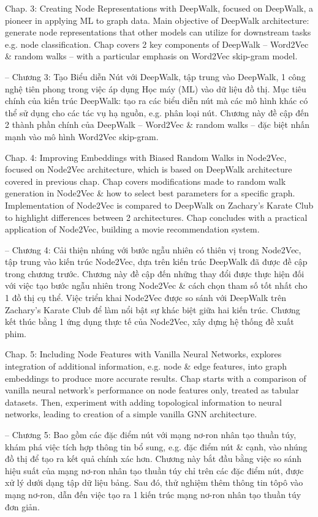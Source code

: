 \documentclass{article}
\begin{document}
\begin{itemize}
\begin{itemize}
        Chap. 3: Creating Node Representations with DeepWalk, focused on DeepWalk, a pioneer in applying ML to graph data. Main objective of DeepWalk architecture: generate node representations that other models can utilize for downstream tasks e.g. node classification. Chap covers 2 key components of DeepWalk -- Word2Vec \& random walks -- with a particular emphasis on Word2Vec skip-gram model.

        -- Chương 3: Tạo Biểu diễn Nút với DeepWalk, tập trung vào DeepWalk, 1 công nghệ tiên phong trong việc áp dụng Học máy (ML) vào dữ liệu đồ thị. Mục tiêu chính của kiến trúc DeepWalk: tạo ra các biểu diễn nút mà các mô hình khác có thể sử dụng cho các tác vụ hạ nguồn, e.g. phân loại nút. Chương này đề cập đến 2 thành phần chính của DeepWalk -- Word2Vec \& random walks -- đặc biệt nhấn mạnh vào mô hình Word2Vec skip-gram.

        Chap. 4: Improving Embeddings with Biased Random Walks in Node2Vec, focused on Node2Vec architecture, which is based on DeepWalk architecture covered in previous chap. Chap covers modifications made to random walk generation in Node2Vec \& how to select best parameters for a specific graph. Implementation of Node2Vec is compared to DeepWalk on Zachary's Karate Club to highlight differences between 2 architectures. Chap concludes with a practical application of Node2Vec, building a movie recommendation system.

        -- Chương 4: Cải thiện nhúng với bước ngẫu nhiên có thiên vị trong Node2Vec, tập trung vào kiến trúc Node2Vec, dựa trên kiến trúc DeepWalk đã được đề cập trong chương trước. Chương này đề cập đến những thay đổi được thực hiện đối với việc tạo bước ngẫu nhiên trong Node2Vec \& cách chọn tham số tốt nhất cho 1 đồ thị cụ thể. Việc triển khai Node2Vec được so sánh với DeepWalk trên Zachary's Karate Club để làm nổi bật sự khác biệt giữa hai kiến trúc. Chương kết thúc bằng 1 ứng dụng thực tế của Node2Vec, xây dựng hệ thống đề xuất phim.

        Chap. 5: Including Node Features with Vanilla Neural Networks, explores integration of additional information, e.g. node \& edge features, into graph embeddings to produce more accurate results. Chap starts with a comparison of vanilla neural network's performance on node features only, treated as tabular datasets. Then, experiment with adding topological information to neural networks, leading to creation of a simple vanilla GNN architecture.

        -- Chương 5: Bao gồm các đặc điểm nút với mạng nơ-ron nhân tạo thuần túy, khám phá việc tích hợp thông tin bổ sung, e.g. đặc điểm nút \& cạnh, vào nhúng đồ thị để tạo ra kết quả chính xác hơn. Chương này bắt đầu bằng việc so sánh hiệu suất của mạng nơ-ron nhân tạo thuần túy chỉ trên các đặc điểm nút, được xử lý dưới dạng tập dữ liệu bảng. Sau đó, thử nghiệm thêm thông tin tôpô vào mạng nơ-ron, dẫn đến việc tạo ra 1 kiến trúc mạng nơ-ron nhân tạo thuần túy đơn giản.


\end{itemize}
\end{itemize}
\end{document}
